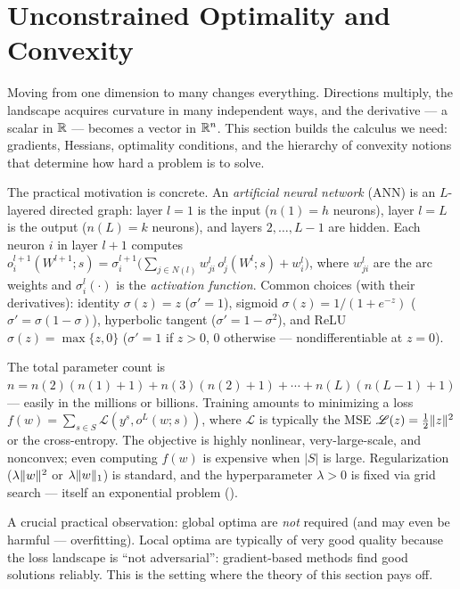 \section{Unconstrained Optimality and Convexity}\label{sec:optimality}

Moving from one dimension to many changes everything.
Directions multiply, the landscape acquires curvature in many independent ways, and the derivative --- a scalar in $\mathbb{R}$ --- becomes a vector in $\mathbb{R}^n$.
This section builds the calculus we need: gradients, Hessians, optimality conditions, and the hierarchy of convexity notions that determine how hard a problem is to solve.

The practical motivation is concrete.
An \textit{artificial neural network} (ANN) is an $L$-layered directed graph: layer $l = 1$ is the input ($n(1) = h$ neurons), layer $l = L$ is the output ($n(L) = k$ neurons), and layers $2, \dots, L-1$ are hidden.
Each neuron $i$ in layer $l+1$ computes
$o_i^{l+1}(W^{l+1}; s) = \sigma_i^{l+1}\bigl(\sum_{j \in N(l)} w_{ji}^l\, o_j^l(W^l; s) + w_i^l\bigr)$,
where $w_{ji}^l$ are the arc weights and $\sigma_i^l(\cdot)$ is the \textit{activation function}.
Common choices (with their derivatives): identity $\sigma(z) = z$ ($\sigma' = 1$), sigmoid $\sigma(z) = 1/(1 + e^{-z})$ ($\sigma' = \sigma(1 - \sigma)$), hyperbolic tangent ($\sigma' = 1 - \sigma^2$), and ReLU $\sigma(z) = \max\{z, 0\}$ ($\sigma' = 1$ if $z > 0$, $0$ otherwise --- nondifferentiable at $z = 0$).

The total parameter count is $n = n(2)(n(1) + 1) + n(3)(n(2) + 1) + \cdots + n(L)(n(L-1) + 1)$ --- easily in the millions or billions.
Training amounts to minimizing a loss $f(w) = \sum_{s \in S} \mathcal{L}(y^s, o^L(w; s))$, where $\mathcal{L}$ is typically the MSE $\mathcal{L}(z) = \frac{1}{2}\lVert z\rVert^2$ or the cross-entropy.
The objective is highly nonlinear, very-large-scale, and nonconvex; even computing $f(w)$ is expensive when $|S|$ is large.
Regularization ($\lambda\lVert w\rVert^2$ or $\lambda\lVert w\rVert_1$) is standard, and the hyperparameter $\lambda > 0$ is fixed via grid search --- itself an exponential problem ().

A crucial practical observation: global optima are \emph{not} required (and may even be harmful --- overfitting).
Local optima are typically of very good quality because the loss landscape is ``not adversarial'': gradient-based methods find good solutions reliably.
This is the setting where the theory of this section pays off.


